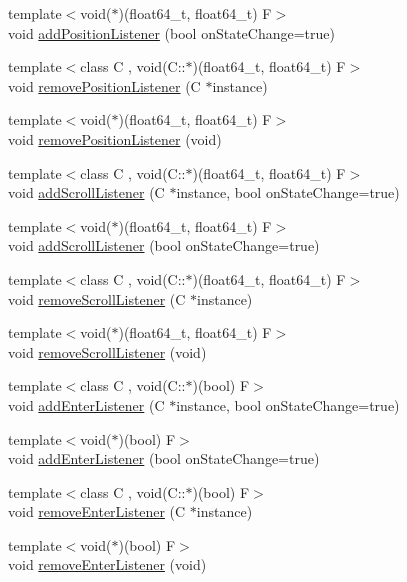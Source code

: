 \begin{DoxyCompactItemize}
{\footnotesize template$<$void($\ast$)(float64\+\_\+t, float64\+\_\+t) F$>$ }\\void \hyperlink{classcrap_1_1_mouse_input_ab789735065df4ee876e69182e01e6e6b}{add\+Position\+Listener} (bool on\+State\+Change=true)
\item 
{\footnotesize template$<$class C , void(\+C\+::$\ast$)(float64\+\_\+t, float64\+\_\+t) F$>$ }\\void \hyperlink{classcrap_1_1_mouse_input_aa36e5678fac0904d769155fbe19e4ef7}{remove\+Position\+Listener} (C $\ast$instance)
\item 
{\footnotesize template$<$void($\ast$)(float64\+\_\+t, float64\+\_\+t) F$>$ }\\void \hyperlink{classcrap_1_1_mouse_input_a60f9de71eb39b01d448ec2daf72d0830}{remove\+Position\+Listener} (void)
\item 
{\footnotesize template$<$class C , void(\+C\+::$\ast$)(float64\+\_\+t, float64\+\_\+t) F$>$ }\\void \hyperlink{classcrap_1_1_mouse_input_a17b73180ec641b18037285641bca5e49}{add\+Scroll\+Listener} (C $\ast$instance, bool on\+State\+Change=true)
\item 
{\footnotesize template$<$void($\ast$)(float64\+\_\+t, float64\+\_\+t) F$>$ }\\void \hyperlink{classcrap_1_1_mouse_input_a4733e227b5c76a7d7b3a96bbd78d1d9f}{add\+Scroll\+Listener} (bool on\+State\+Change=true)
\item 
{\footnotesize template$<$class C , void(\+C\+::$\ast$)(float64\+\_\+t, float64\+\_\+t) F$>$ }\\void \hyperlink{classcrap_1_1_mouse_input_a61b03a187d63fc67fd75e35e4887a12d}{remove\+Scroll\+Listener} (C $\ast$instance)
\item 
{\footnotesize template$<$void($\ast$)(float64\+\_\+t, float64\+\_\+t) F$>$ }\\void \hyperlink{classcrap_1_1_mouse_input_afd9dad5daf30f80c19d741ec4f852a84}{remove\+Scroll\+Listener} (void)
\item 
{\footnotesize template$<$class C , void(\+C\+::$\ast$)(bool) F$>$ }\\void \hyperlink{classcrap_1_1_mouse_input_a92312eeaaef50547610bab5c6b2f8d21}{add\+Enter\+Listener} (C $\ast$instance, bool on\+State\+Change=true)
\item 
{\footnotesize template$<$void($\ast$)(bool) F$>$ }\\void \hyperlink{classcrap_1_1_mouse_input_ab8530e1ed07245bd1741ed36b9a2cdca}{add\+Enter\+Listener} (bool on\+State\+Change=true)
\item 
{\footnotesize template$<$class C , void(\+C\+::$\ast$)(bool) F$>$ }\\void \hyperlink{classcrap_1_1_mouse_input_a1ec64719bdb5c2111d1dc3099cd16745}{remove\+Enter\+Listener} (C $\ast$instance)
\item 
{\footnotesize template$<$void($\ast$)(bool) F$>$ }\\void \hyperlink{classcrap_1_1_mouse_input_ab940e9c365f6a3f304ce2315d259488b}{remove\+Enter\+Listener} (void)
\end{DoxyCompactItemize}
